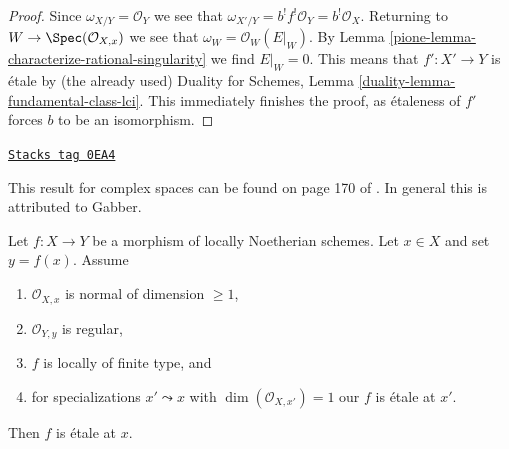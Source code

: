 \begin{proof}
\medskip\noindent
Since $\omega_{X/Y} = \mathcal{O}_Y$ we see that
$\omega_{X'/Y} = b^! f^!\mathcal{O}_Y = b^!\mathcal{O}_X$.
Returning to $W \to \Spec(\mathcal{O}_{X, x})$
we see that $\omega_W = \mathcal{O}_W(E|_W)$.
By Lemma \ref{pione-lemma-characterize-rational-singularity}
we find $E|_W = 0$.
This means that $f' : X' \to Y$ is \'etale by (the already used)
Duality for Schemes, Lemma \ref{duality-lemma-fundamental-class-lci}.
This immediately finishes the proof, as \'etaleness
of $f'$ forces $b$ to be an isomorphism.
\end{proof}

\begin{lemma}

\label{pione-lemma-purity-ramification}
\href{https://stacks.math.columbia.edu/tag/0EA4}{\texttt{Stacks tag 0EA4}}

\begin{reference}
This result for complex spaces can be found on page 170 of \cite{Fischer}.
In general this is \cite[Theorem 2.4]{Zong} attributed to Gabber.
\end{reference}
Let $f : X \to Y$ be a morphism of locally Noetherian schemes.
Let $x \in X$ and set $y = f(x)$. Assume
\begin{enumerate}
\item $\mathcal{O}_{X, x}$ is normal of dimension $\geq 1$,
\item $\mathcal{O}_{Y, y}$ is regular,
\item $f$ is locally of finite type, and
\item for specializations $x' \leadsto x$ with
$\dim(\mathcal{O}_{X, x'}) = 1$ our $f$ is \'etale at $x'$.
\end{enumerate}
Then $f$ is \'etale at $x$.
\end{lemma}

